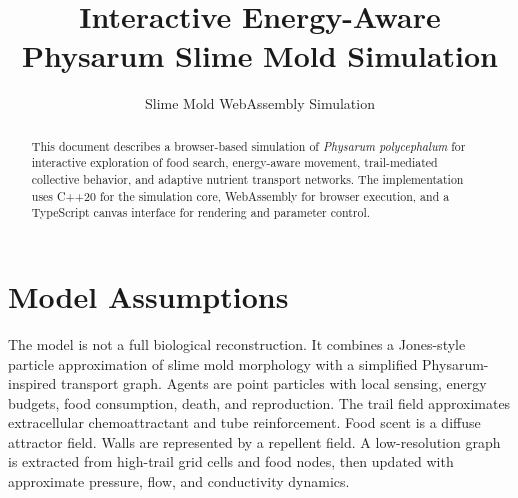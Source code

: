 \documentclass[11pt]{article}
\title{Interactive Energy-Aware Physarum Slime Mold Simulation}
\author{Slime Mold WebAssembly Simulation}
\date{}
\begin{document}
\maketitle

\begin{abstract}
This document describes a browser-based simulation of \emph{Physarum polycephalum}
for interactive exploration of food search, energy-aware movement, trail-mediated
collective behavior, and adaptive nutrient transport networks. The implementation
uses C++20 for the simulation core, WebAssembly for browser execution, and a
TypeScript canvas interface for rendering and parameter control.
\end{abstract}

\section{Model Assumptions}
The model is not a full biological reconstruction. It combines a Jones-style
particle approximation of slime mold morphology with a simplified Physarum-inspired
transport graph. Agents are point particles with local sensing, energy budgets,
food consumption, death, and reproduction. The trail field approximates extracellular
chemoattractant and tube reinforcement. Food scent is a diffuse attractor field.
Walls are represented by a repellent field. A low-resolution graph is extracted
from high-trail grid cells and food nodes, then updated with approximate pressure,
flow, and conductivity dynamics.
\end{document}
